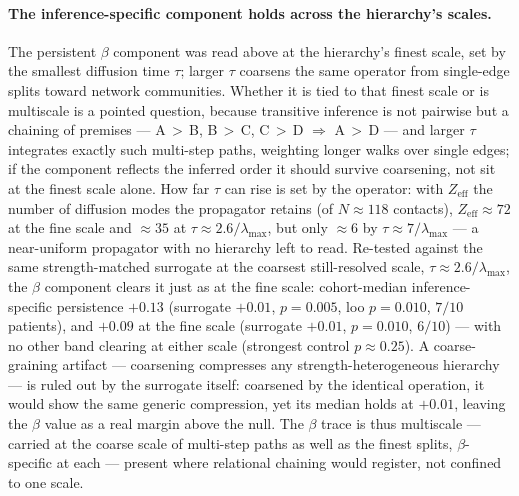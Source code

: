 \paragraph{The inference-specific component holds across the hierarchy's scales.}
The persistent \(\beta\) component was read above at the hierarchy's finest scale, set by the smallest diffusion time \(\tau\); larger \(\tau\) coarsens the same operator from single-edge splits toward network communities. Whether it is tied to that finest scale or is multiscale is a pointed question, because transitive inference is not pairwise but a chaining of premises --- A\,\(>\)\,B, B\,\(>\)\,C, C\,\(>\)\,D \(\Rightarrow\) A\,\(>\)\,D --- and larger \(\tau\) integrates exactly such multi-step paths, weighting longer walks over single edges; if the component reflects the inferred order it should survive coarsening, not sit at the finest scale alone. How far \(\tau\) can rise is set by the operator: with \(Z_{\mathrm{eff}}\) the number of diffusion modes the propagator retains (of \(N \approx 118\) contacts), \(Z_{\mathrm{eff}} \approx 72\) at the fine scale and \(\approx 35\) at \(\tau \approx 2.6/\lambda_{\max}\), but only \(\approx 6\) by \(\tau \approx 7/\lambda_{\max}\) --- a near-uniform propagator with no hierarchy left to read. Re-tested against the same strength-matched surrogate at the coarsest still-resolved scale, \(\tau \approx 2.6/\lambda_{\max}\), the \(\beta\) component clears it just as at the fine scale: cohort-median inference-specific persistence \({+}0.13\) (surrogate \({+}0.01\), \(p = 0.005\), \gls{loo} \(p = 0.010\), \(7/10\) patients), and \({+}0.09\) at the fine scale (surrogate \({+}0.01\), \(p = 0.010\), \(6/10\)) --- with no other band clearing at either scale (strongest control \(p \approx 0.25\)). A coarse-graining artifact --- coarsening compresses any strength-heterogeneous hierarchy --- is ruled out by the surrogate itself: coarsened by the identical operation, it would show the same generic compression, yet its median holds at \({+}0.01\), leaving the \(\beta\) value as a real margin above the null. The \(\beta\) trace is thus multiscale --- carried at the coarse scale of multi-step paths as well as the finest splits, \(\beta\)-specific at each --- present where relational chaining would register, not confined to one scale.
